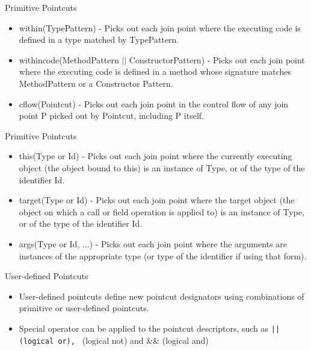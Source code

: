 \documentclass[11pt]{beamer}
\begin{document}
\begin{frame}{Primitive Pointcuts}
  \begin{itemize}
    \item within(TypePattern) -
    Picks out each join point where the executing code is defined in a type matched by TypePattern. 
    \item withincode(MethodPattern $||$ ConstructorPattern) -
    Picks out each join point where the executing code is defined in a method whose signature matches MethodPattern or a Constructor Pattern. 
    \item cflow(Pointcut) -
    Picks out each join point in the control flow of any join point P picked out by Pointcut, including P itself. 
  \end{itemize}
\end{frame}

\begin{frame}{Primitive Pointcuts}
  \begin{itemize}
    \item this(Type or Id) -
    Picks out each join point where the currently executing object (the object bound to this) is an instance of Type, or of the type of the identifier Id. 
    \item target(Type or Id) -
    Picks out each join point where the target object (the object on which a call or field operation is applied to) is an instance of Type, or of the type of the identifier Id.
    \item args(Type or Id, ...) -
    Picks out each join point where the arguments are instances of the appropriate type (or type of the identifier if using that form). 
  \end{itemize}
\end{frame}


\begin{frame}{User-defined Pointcuts}
  \begin{itemize}
    \item User-defined pointcuts define new pointcut designators using combinations of primitive or user-defined pointcuts.
    \item Special operator can be applied to the pointcut descriptors, such as \verb!|| (logical or), ! (logical not) and \&\& (logical and)
  \end{itemize}
\end{frame}
\end{document}

